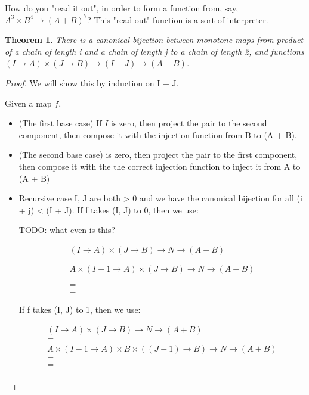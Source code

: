 \documentclass{proc-l}
\newtheorem{theorem}{Theorem}[section]
\theoremstyle{definition}
\theoremstyle{remark}
\numberwithin{equation}{section}
\begin{document}
How do you "read it out", in order to form a function from, say, 
\(A^3 \times B^4 \to (A + B)^7\)? This "read out" function is a sort of interpreter.


\begin{theorem}
There is a canonical bijection between monotone maps from product of a chain of length i and a chain of length j to a chain of length 2, and functions \((I \to A) \times (J \to B) \to (I + J) \to (A + B)\).
\end{theorem}

\begin{proof}
We will show this by induction on I + J.

Given a map \(f\),

\begin{itemize}
\item (The first base case) If \(I\) is zero, then project the pair to the second component, then compose it with the injection function from B to (A + B).

\item (The second base case) is zero, then project the pair to the first component, then compose it with the the correct injection function to inject it from A to (A + B)

\item Recursive case I, J are both > 0 and we have the canonical bijection for all (i + j) < (I + J).
If f takes (I, J) to 0, then 
we use:

TODO: what even is this?

\begin{align*}
(I \to A) \times (J \to B) \to N \to (A + B) \\
= \tag{by factoring an A out of \(I \to A\)? Need a lemma for that?} \\
A \times (I-1 \to A) \times (J \to B) \to N \to (A + B) \\
= \\
= \tag{by invoking the canonical bijection recursively} \\
= \tag{by injecting \(A \to (A + B)\)}
\end{align*}

If f takes (I, J) to 1, then
we use:

\begin{align*}
(I \to A) \times (J \to B) \to N \to (A + B) \\
= \tag{by factoring an A out of \(I \to A\)? Need a lemma for that?} \\
A \times (I-1 \to A) \times B \times ((J-1) \to B) \to N \to (A + B) \\
= \tag{by invoking the canonical bijection recursively} \\
= \tag{by injecting \(A \to (A + B)\)} \\
\end{align*}
\end{itemize}

\end{proof}


\end{document}
